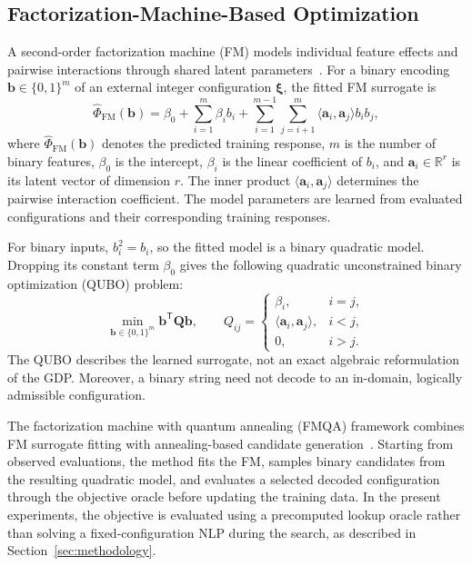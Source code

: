 \documentclass{article}
\begin{document}
\subsection{Factorization-Machine-Based Optimization}

A second-order factorization machine (FM) models individual feature effects and pairwise interactions through shared latent parameters~\cite{rendle2010factorization}. 
For a binary encoding \(\mathbf b\in\{0,1\}^{m}\) of an external integer configuration \(\boldsymbol\xi\), the fitted FM surrogate is
\begin{equation}\label{eqn:fm.surrogate}
\widehat\Phi_{\mathrm{FM}}(\mathbf b)
=\beta_0+\sum_{i=1}^{m}\beta_i b_i
+\sum_{i=1}^{m-1}\sum_{j=i+1}^{m}
\langle\mathbf a_i,\mathbf a_j\rangle b_i b_j,
\end{equation}
where \(\widehat\Phi_{\mathrm{FM}}(\mathbf b)\) denotes the predicted training response, \(m\) is the number of binary features, \(\beta_0\) is the intercept, $\beta_i$ is the linear coefficient of \(b_i\), and \(\mathbf a_i\in\mathbb R^r\) is its latent vector of dimension \(r\).
The inner product \(\langle\mathbf a_i,\mathbf a_j\rangle\) determines the pairwise interaction coefficient.
The model parameters are learned from evaluated configurations and their corresponding training responses.

For binary inputs, \(b_i^2=b_i\), so the fitted model is a binary quadratic model. 
Dropping its constant term \(\beta_0\) gives the following quadratic unconstrained binary optimization (QUBO) problem:
\begin{equation}\label{eqn:fm.qubo}
\min_{\mathbf b\in\{0,1\}^{m}}\mathbf b^{\mathsf T}\mathbf Q\mathbf b,
\qquad
Q_{ij}=\begin{cases}
\beta_i,&i=j,\\
\langle\mathbf a_i,\mathbf a_j\rangle,&i<j,\\
0,&i>j.
\end{cases}
\end{equation}
The QUBO describes the learned surrogate, not an exact algebraic reformulation of the GDP. 
Moreover, a binary string need not decode to an in-domain, logically admissible configuration.

The factorization machine with quantum annealing (FMQA) framework combines FM surrogate fitting with annealing-based candidate generation~\cite{kitai2020designing}. 
Starting from observed evaluations, the method fits the FM, samples binary candidates from the resulting quadratic model, and evaluates a selected decoded configuration through the objective oracle before updating the training data. 
In the present experiments, the objective is evaluated using a precomputed lookup oracle rather than solving a fixed-configuration NLP during the search, as described in Section~\ref{sec:methodology}. 
\end{document}
